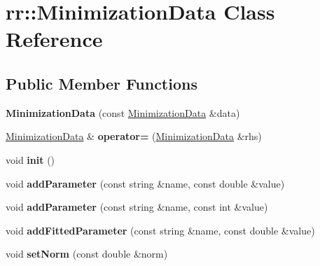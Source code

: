 \hypertarget{classrr_1_1_minimization_data}{\section{rr\-:\-:Minimization\-Data Class Reference}
\label{classrr_1_1_minimization_data}
}
\subsection*{Public Member Functions}
\begin{DoxyCompactItemize}
\item 
\hypertarget{classrr_1_1_minimization_data_a2cf0cc0db6ab487962d6f2964dc60ada}{{\bfseries Minimization\-Data} (const \hyperlink{classrr_1_1_minimization_data}{Minimization\-Data} \&data)}\label{classrr_1_1_minimization_data_a2cf0cc0db6ab487962d6f2964dc60ada}

\item 
\hypertarget{classrr_1_1_minimization_data_a6c4bdc0923f2d72111a71535535434ab}{\hyperlink{classrr_1_1_minimization_data}{Minimization\-Data} \& {\bfseries operator=} (\hyperlink{classrr_1_1_minimization_data}{Minimization\-Data} \&rhs)}\label{classrr_1_1_minimization_data_a6c4bdc0923f2d72111a71535535434ab}

\item 
\hypertarget{classrr_1_1_minimization_data_a4ed054175686b3f62382b8eb2d0913de}{void {\bfseries init} ()}\label{classrr_1_1_minimization_data_a4ed054175686b3f62382b8eb2d0913de}

\item 
\hypertarget{classrr_1_1_minimization_data_a6258ec242c5ece736faf8a224b547e6e}{void {\bfseries add\-Parameter} (const string \&name, const double \&value)}\label{classrr_1_1_minimization_data_a6258ec242c5ece736faf8a224b547e6e}

\item 
\hypertarget{classrr_1_1_minimization_data_ade3c38376666876a0abc367ea9a12d32}{void {\bfseries add\-Parameter} (const string \&name, const int \&value)}\label{classrr_1_1_minimization_data_ade3c38376666876a0abc367ea9a12d32}

\item 
\hypertarget{classrr_1_1_minimization_data_a1858288d7cfb4bf7cd80676b49b448de}{void {\bfseries add\-Fitted\-Parameter} (const string \&name, const double \&value)}\label{classrr_1_1_minimization_data_a1858288d7cfb4bf7cd80676b49b448de}

\item 
\hypertarget{classrr_1_1_minimization_data_a92c8c6d589307b3947c47af271b6517f}{void {\bfseries set\-Norm} (const double \&norm)}\label{classrr_1_1_minimization_data_a92c8c6d589307b3947c47af271b6517f}


\end{DoxyCompactItemize}
